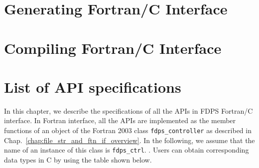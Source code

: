 \documentclass[12pt,a4paper,dvipdfmx]{book} %
\begin{document}
\chapter{Generating Fortran/C Interface}
\label{chap:script_spec}

\newpage

\chapter{Compiling Fortran/C Interface}
\label{chap:compile_and_macro}

\newpage

\chapter{List of API specifications}
\label{chap:API_spec_list}
In this chapter, we describe the specifications of all the APIs in FDPS Fortran/C interface. In Fortran interface, all the APIs are implemented as the member functions of an object of the Fortran 2003 class \texttt{fdps\_controller} as described in Chap.~\ref{chap:file_str_and_ftn_if_overview}. In the following, we assume that the name of an instance of this class is \texttt{fdps\_ctrl}. {\setnoko{}}. Users can obtain corresponding data types in C by using the table shown below.
\clearpage
\end{document}
